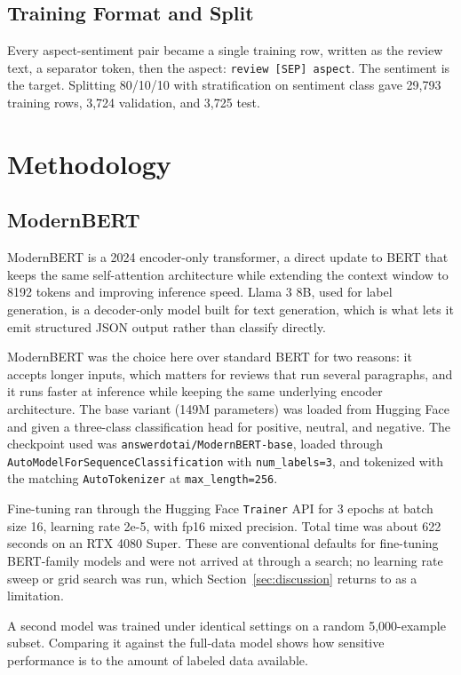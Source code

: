 \documentclass[sigconf]{acmart}
\begin{document}
\subsection{Training Format and Split}
Every aspect-sentiment pair became a single training row, written as the review text, a separator token, then the aspect: \texttt{review [SEP] aspect}. The sentiment is the target. Splitting 80/10/10 with stratification on sentiment class gave 29,793 training rows, 3,724 validation, and 3,725 test.

\section{Methodology}

\subsection{ModernBERT}
ModernBERT is a 2024 encoder-only transformer, a direct update to BERT that keeps the same self-attention architecture while extending the context window to 8192 tokens and improving inference speed. Llama 3 8B, used for label generation, is a decoder-only model built for text generation, which is what lets it emit structured JSON output rather than classify directly.

ModernBERT was the choice here over standard BERT for two reasons: it accepts longer inputs, which matters for reviews that run several paragraphs, and it runs faster at inference while keeping the same underlying encoder architecture. The base variant (149M parameters) was loaded from Hugging Face and given a three-class classification head for positive, neutral, and negative. The checkpoint used was \texttt{answerdotai/ModernBERT-base}, loaded through \texttt{AutoModelForSequenceClassification} with \texttt{num\_labels=3}, and tokenized with the matching \texttt{AutoTokenizer} at \texttt{max\_length=256}.

Fine-tuning ran through the Hugging Face \texttt{Trainer} API for 3 epochs at batch size 16, learning rate 2e-5, with fp16 mixed precision. Total time was about 622 seconds on an RTX 4080 Super. These are conventional defaults for fine-tuning BERT-family models and were not arrived at through a search; no learning rate sweep or grid search was run, which Section~\ref{sec:discussion} returns to as a limitation.

A second model was trained under identical settings on a random 5,000-example subset. Comparing it against the full-data model shows how sensitive performance is to the amount of labeled data available.
\end{document}

